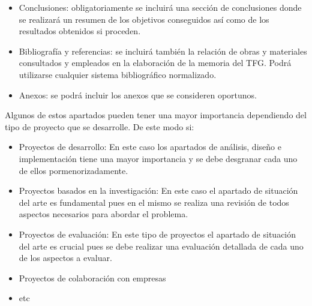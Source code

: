 \begin{list}
\begin{itemize}
\begin{itemize}
\item Introducción: donde se hará énfasis a la importancia de la temática,
su vigencia y actualidad; se planteará el problema a investigar, así
como el propósito o finalidad de la investigación.
\item Marco teórico o Estado del arte : se hará mención a los elementos
conceptuales que sirven de base para la investigación, estudios previos
relacionados con el problema planteado, etc. 
\item Metodología : se indicará el tipo o tipos de investigación, las técnicas
y los procedimientos que serán utilizados para llevarla a cabo; se
identificará la población y el tamaño de la muestra así como las técnicas
e instrumentos de recolección de datos. 
\item Cuerpo del trabajo: Incluirá los resultados de la investigación o
trabajo, así como el análisis y la discusión de los mismos. Normalmente
en los TFG suele corresponderse a un ciclo de vida de desarrollo de
un sistema de información, concretamente: 

\begin{itemize}
\item Análisis del sistema
\item Diseño del Sistema
\item Implementación del Sistema
\end{itemize}
\end{itemize}
\item Conclusiones: obligatoriamente se incluirá una sección de conclusiones
donde se realizará un resumen de los objetivos conseguidos así como
de los resultados obtenidos si proceden. 
\item Bibliografía y referencias: se incluirá también la relación de obras
y materiales consultados y empleados en la elaboración de la memoria
del TFG. Podrá utilizarse cualquier sistema bibliográfico normalizado. 
\item Anexos: se podrá incluir los anexos que se consideren oportunos. 
\end{itemize}
Algunos de estos apartados pueden tener una mayor importancia dependiendo
del tipo de proyecto que se desarrolle. De este modo si: 
\begin{itemize}
\item Proyectos de desarrollo: En este caso los apartados de análisis, diseño
e implementación tiene una mayor importancia y se debe desgranar cada
uno de ellos pormenorizadamente. 
\item Proyectos basados en la investigación: En este caso el apartado de
situación del arte es fundamental pues en el mismo se realiza una
revisión de todos aspectos necesarios para abordar el problema. 
\item Proyectos de evaluación: En este tipo de proyectos el apartado de
situación del arte es crucial pues se debe realizar una evaluación
detallada de cada uno de los aspectos a evaluar. 
\item Proyectos de colaboración con empresas
\item etc
\end{itemize}


\end{list}
